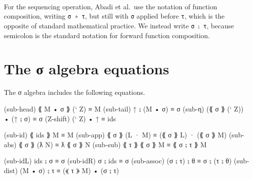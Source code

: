 \begin{fence}
\begin{code}%
\>[0]\AgdaSpace{}%
\AgdaSpace{}%
\<%
\\
%
\\[\AgdaEmptyExtraSkip]%
\>[0]\AgdaSpace{}%
\AgdaSymbol{:}\AgdaSpace{}%
\AgdaSpace{}%
\AgdaSpace{}%
\AgdaSymbol{\}}\AgdaSpace{}%
\AgdaSpace{}%
\AgdaSpace{}%
\AgdaSpace{}%
\AgdaSpace{}%
\AgdaSpace{}%
\AgdaSpace{}%
\AgdaSpace{}%
\AgdaSpace{}%
\AgdaSpace{}%
\AgdaSpace{}%
\AgdaSpace{}%
\<%
\\
\>[0]\AgdaSpace{}%
\AgdaSpace{}%
\AgdaSpace{}%
\AgdaSymbol{=}\AgdaSpace{}%
\AgdaSpace{}%
\AgdaSpace{}%
\AgdaSpace{}%
\AgdaSpace{}%
\<%
\end{code}
\end{fence}

For the sequencing operation, Abadi et al.~use the notation of function
composition, writing \texttt{σ\ ∘\ τ}, but still with \texttt{σ} applied
before \texttt{τ}, which is the opposite of standard mathematical
practice. We instead write \texttt{σ\ ⨟\ τ}, because semicolon is the
standard notation for forward function composition.

\hypertarget{the-ux3c3-algebra-equations}{%
\section{The σ algebra equations}\label{the-ux3c3-algebra-equations}}

The σ algebra includes the following equations.

\begin{myDisplay}
(sub-head)  ⟪ M • σ ⟫ (` Z) ≡ M
(sub-tail)  ↑ ⨟ (M • σ)    ≡ σ
(sub-η)     (⟪ σ ⟫ (` Z)) • (↑ ⨟ σ) ≡ σ
(Z-shift)   (` Z) • ↑      ≡ ids

(sub-id)    ⟪ ids ⟫ M      ≡ M
(sub-app)   ⟪ σ ⟫ (L · M)  ≡ (⟪ σ ⟫ L) · (⟪ σ ⟫ M)
(sub-abs)   ⟪ σ ⟫ (ƛ N)    ≡ ƛ ⟪ σ ⟫ N
(sub-sub)   ⟪ τ ⟫ ⟪ σ ⟫ M  ≡ ⟪ σ ⨟ τ ⟫ M

(sub-idL)   ids ⨟ σ        ≡ σ
(sub-idR)   σ ⨟ ids        ≡ σ
(sub-assoc) (σ ⨟ τ) ⨟ θ    ≡ σ ⨟ (τ ⨟ θ)
(sub-dist)  (M • σ) ⨟ τ    ≡ (⟪ τ ⟫ M) • (σ ⨟ τ)
\end{myDisplay}

